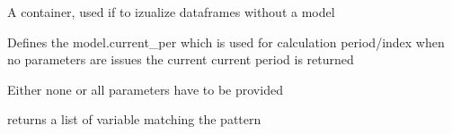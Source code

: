 \documentclass[letterpaper,10pt,english]{sphinxmanual}
\begin{document}
\begin{fulllineitems}
\label{\detokenize{index:modelvis.container}}
\pysigstartsignatures
{}
\pysigstopsignatures
\sphinxAtStartPar
A container, used if to izualize dataframes without a model

\begin{fulllineitems}
\label{\detokenize{index:modelvis.container.smpl}}
\pysigstartsignatures
{}
\pysigstopsignatures
\sphinxAtStartPar
Defines the model.current\_per which is used for calculation period/index
when no parameters are issues the current current period is returned

\sphinxAtStartPar
Either none or all parameters have to be provided

\end{fulllineitems}


\begin{fulllineitems}
\label{\detokenize{index:modelvis.container.vlist}}
\pysigstartsignatures
{}
\pysigstopsignatures
\sphinxAtStartPar
returns a list of variable matching the pattern

\end{fulllineitems}


\end{fulllineitems}

\end{document}
